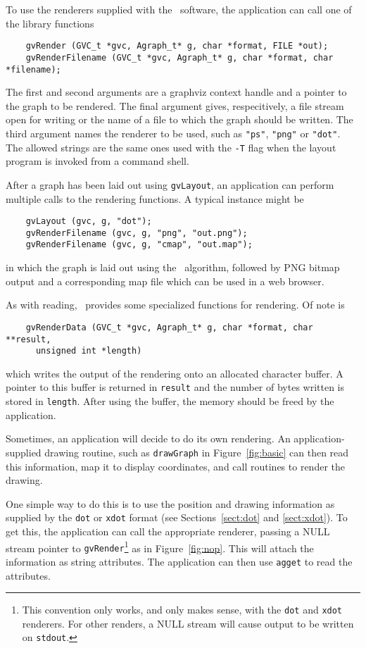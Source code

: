 To use the renderers supplied with the \gviz\ software, the application
can call one of the library functions 
\begin{verbatim}
    gvRender (GVC_t *gvc, Agraph_t* g, char *format, FILE *out);
    gvRenderFilename (GVC_t *gvc, Agraph_t* g, char *format, char *filename);
\end{verbatim}
The first and second arguments are a graphviz context handle and a pointer
to the graph to be rendered. The final argument gives, respecitively,
a file stream open for writing or the name of a file to which the
graph should be written. The third argument names the renderer to
be used, such as {\tt "ps"}, {\tt "png"} or {\tt "dot"}.
The allowed strings are the same ones used with the {\tt -T} flag
when the layout program is invoked from a command shell.

After a graph has been laid out using {\tt gvLayout}, an application
can perform multiple calls to the rendering functions. A typical instance
might be  
\begin{verbatim}
    gvLayout (gvc, g, "dot");
    gvRenderFilename (gvc, g, "png", "out.png");
    gvRenderFilename (gvc, g, "cmap", "out.map");
\end{verbatim}
in which the graph is laid out using the \dot\ algorithm, followed by
PNG bitmap output and a corresponding map file which can be used in a web
browser.

As with reading, \gviz\ provides some specialized functions for rendering.
Of note is
\begin{verbatim}
    gvRenderData (GVC_t *gvc, Agraph_t* g, char *format, char **result, 
      unsigned int *length)
\end{verbatim}
which writes the output of the rendering onto an allocated character buffer. A pointer
to this buffer is returned in {\tt result} and the number of bytes written is stored in
{\tt length}. After using the buffer, the memory should be freed by the application.

Sometimes, an application will decide to do its own rendering.
An application-supplied
drawing routine, such as {\tt drawGraph} in Figure~\ref{fig:basic}
can then read this information,
map it to display coordinates, and call routines to render the drawing.

One simple way to do this is to use the position and drawing information as
supplied by the {\tt dot} or {\tt xdot} format (see
Sections~\ref{sect:dot} and \ref{sect:xdot}). To get this, the application
can call the appropriate renderer, passing a NULL stream
pointer to {\tt gvRender}\footnote{
This convention only works, and only makes sense, with the {\tt dot} 
and {\tt xdot} renderers. For other renders, a NULL stream will cause
output to be written on {\tt stdout}.} as in Figure~\ref{fig:nop}.
This will attach the information as string attributes. The application
can then use {\tt agget} to read the attributes.


